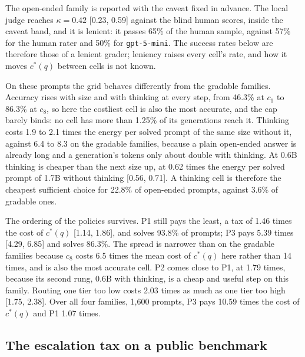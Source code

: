 \documentclass[final,5p,times,twocolumn]{elsarticle}
\theoremstyle{plain}
\newcommand{\cstar}{c^{*}}
\begin{document}
The open-ended family is reported with the caveat fixed in advance. The local
judge reaches $\kappa = 0.42$ [0.23, 0.59] against the blind human scores,
inside the caveat band, and it is lenient: it passes 65\% of the human
sample, against 57\% for the human rater and 50\% for
\texttt{gpt-5-mini}. The success rates below are therefore those of a lenient
grader; leniency raises every cell's rate, and how it moves $\cstar(q)$
between cells is not known.

On these prompts the grid behaves differently from the gradable families.
Accuracy rises with size and with thinking at every step, from 46.3\% at
$c_1$ to 86.3\% at $c_8$, so here the costliest cell is also the most
accurate, and the cap barely binds: no cell has more than 1.25\% of its
generations reach it. Thinking costs 1.9 to 2.1 times the energy per solved
prompt of the same size without it, against 6.4 to 8.3 on the gradable
families, because a plain open-ended answer is already long and a
generation's tokens only about double with thinking. At 0.6B thinking is
cheaper than the next size up, at 0.62 times the energy per solved prompt of
1.7B without thinking [0.56, 0.71]. A thinking cell is therefore the cheapest
sufficient choice for 22.8\% of open-ended prompts, against 3.6\% of gradable
ones.

The ordering of the policies survives. P1 still pays the least, a tax of 1.46
times the cost of $\cstar(q)$ [1.14, 1.86], and solves 93.8\% of prompts; P3
pays 5.39 times [4.29, 6.85] and solves 86.3\%. The spread is narrower than
on the gradable families because $c_8$ costs 6.5 times the mean cost of
$\cstar(q)$ here rather than 14 times, and is also the most accurate cell. P2
comes close to P1, at 1.79 times, because its second rung, 0.6B with
thinking, is a cheap and useful step on this family. Routing one tier too low
costs 2.03 times as much as one tier too high [1.75, 2.38]. Over all four
families, 1{,}600 prompts, P3 pays 10.59 times the cost of $\cstar(q)$ and P1
1.07 times.

\subsection{The escalation tax on a public benchmark}
\label{sec:results-public}
\end{document}
